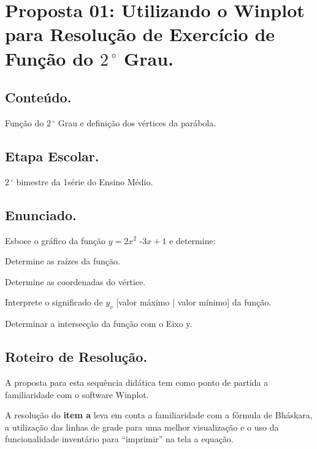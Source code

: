 \documentclass[a4paper,12pt]{article}
\begin{document}


\section {Proposta 01: Utilizando o Winplot para Resolução de Exercício de Função do $2\,^{\circ}$ Grau.}

\subsection{Conteúdo.}

Função do $2\,^{\circ}$ Grau e definição dos vértices da parábola.

\subsection{Etapa Escolar.}

$2\,^{\circ}$ bimestre da 1\textordfeminine série do Ensino Médio.

\subsection{Enunciado.}

Esboce o gráfico da função $y = 2x^2$ -$ 3x + 1$ e determine:

\begin{list}{) }{}
\item Determine as raízes da função.
\item Determine as coordenadas do vértice.
\item Interprete o significado de ${y_v}$ [valor máximo | valor mínimo] da função.
\item Determinar a intersecção da função com o Eixo y.
\end{list}

\subsection{Roteiro de Resolução.}

A proposta para esta sequência didática tem como ponto de partida a familiaridade com o software Winplot.

A resolução do \textbf{item a} leva em conta a familiaridade com a fórmula de Bháskara, a utilização das linhas de grade para uma melhor visualização e o uso da funcionalidade inventário para “imprimir” na tela a equação.
\end{document}
